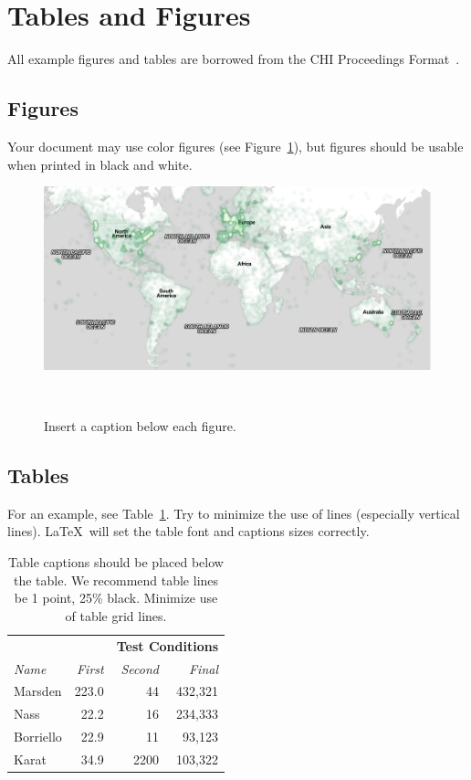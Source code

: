 \documentclass{article}
\begin{document}
\section{Tables and Figures}

All example figures and tables are borrowed from the CHI Proceedings Format~\cite{CHI}.

\subsection{Figures}
Your document may use color figures (see
Figure~\ref{fig:sample}), but figures should be usable when printed in black and white. 

\begin{figure}
  \begin{centering}
  \includegraphics[width=0.9\columnwidth]{map.png}
  \caption{Insert a caption below each figure.}~\label{fig:sample}
  \end{centering}
\end{figure}

\subsection{Tables}
For an example, see Table~\ref{tab:table1}. Try to
minimize the use of lines (especially vertical lines). \LaTeX\ will
set the table font and captions sizes correctly.

\begin{table}
  \centering
  \begin{tabular}{l r r r}
    & & \multicolumn{2}{c}{\small{\textbf{Test Conditions}}} \\
    \cmidrule(r){3-4}
    {\small\textit{Name}}
    & {\small \textit{First}}
      & {\small \textit{Second}}
    & {\small \textit{Final}} \\
    \midrule
    Marsden & 223.0 & 44 & 432,321 \\
    Nass & 22.2 & 16 & 234,333 \\
    Borriello & 22.9 & 11 & 93,123 \\
    Karat & 34.9 & 2200 & 103,322 \\
  \end{tabular}
  \caption{Table captions should be placed below the table. We
    recommend table lines be 1 point, 25\% black. Minimize use of
    table grid lines.}~\label{tab:table1}
\end{table}
\end{document}
